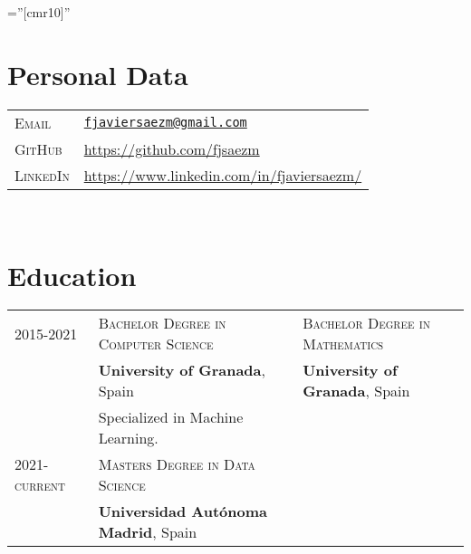 \documentclass[a4paper,11pt]{article} %
\begin{document}
\pagestyle{empty} %

\font\fb=''[cmr10]'' %


\par{\bigskip\par} %

\section{Personal Data}

\begin{tabular}{ll}
  \textsc{Email} & \href{mailto:fjaviersaem@gmail.com}{\texttt{fjaviersaezm@gmail.com}} \\
   \textsc{GitHub} &  {\setmainfont[SmallCapsFont = Fontin SmallCaps]{Fontin-Regular}\href{https://github.com/fjsaezm}{https://github.com/fjsaezm}}\\ 
  \textsc{LinkedIn} & {\setmainfont[SmallCapsFont = Fontin SmallCaps]{Fontin-Regular}\href{https://www.linkedin.com/in/fjaviersaezm/}{https://www.linkedin.com/in/fjaviersaezm/}}
\end{tabular}\\



\section{Education}

\begin{tabular}{lp{7cm}l}
  \textsc{2015-2021}
  & \textsc{Bachelor Degree in Computer Science}   & \textsc{Bachelor Degree in Mathematics}\\
  & \footnotesize \textbf{University of Granada}, Spain     & \footnotesize \textbf{University of Granada}, Spain\\\
  & \footnotesize Specialized in Machine Learning. &  \\
  \textsc{2021-current}
  & \textsc{Masters Degree in Data Science} \\
  & \footnotesize \textbf{Universidad Autónoma Madrid}, Spain \\
\end{tabular}\\
\end{document}
